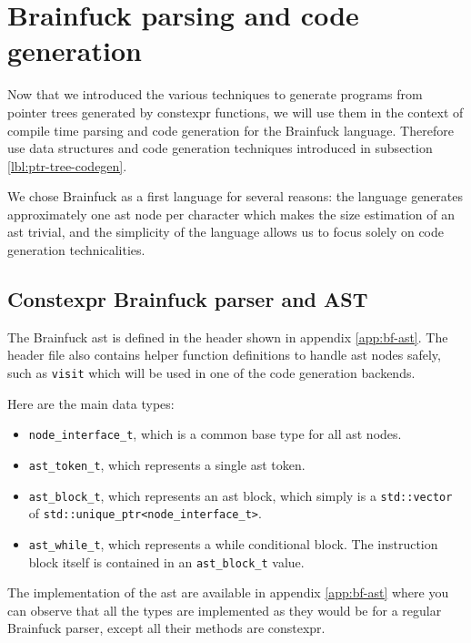 \documentclass[../main]{subfiles}
\begin{document}
\section{
  Brainfuck parsing and code generation
}
\label{lbl:bf-parsing-and-codegen}

Now that we introduced the various techniques to generate programs from
pointer trees generated by \gls{constexpr} functions, we will use them in the
context of compile time parsing and code generation for the Brainfuck language.
Therefore use data structures and code generation techniques introduced in
subsection \ref{lbl:ptr-tree-codegen}.

We chose Brainfuck as a first language for several reasons: the language
generates approximately one \gls{ast} node per character which makes the size
estimation of an \gls{ast} trivial, and the simplicity of the language allows us
to focus solely on code generation technicalities.

\subsection{
  Constexpr Brainfuck parser and AST
}

The Brainfuck \gls{ast} is defined in the header shown in appendix
\ref{app:bf-ast}. The header file also contains helper function definitions
to handle \gls{ast} nodes safely, such as \lstinline{visit} which will be used
in one of the code generation backends.

Here are the main data types:

\begin{itemize}
\item
\lstinline{node_interface_t}, which is a common base type for all \gls{ast} nodes.

\item
\lstinline{ast_token_t}, which represents a single \gls{ast} token.

\item
\lstinline{ast_block_t}, which represents an \gls{ast} block, which simply is a
\lstinline{std::vector} of \lstinline{std::unique_ptr<node_interface_t>}.

\item
\lstinline{ast_while_t}, which represents a while conditional block.
The instruction block itself is contained in an \lstinline{ast_block_t} value.

\end{itemize}

The implementation of the \gls{ast} are available in appendix \ref{app:bf-ast}
where you can observe that all the types are implemented as they would be
for a regular Brainfuck parser, except all their methods are \gls{constexpr}.
\end{document}

